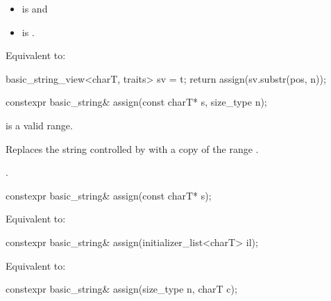 \begin{itemdescr}
\pnum
\constraints
\begin{itemize}
\item
{} is
 and
\item
{} is
.
\end{itemize}

\pnum
\effects
Equivalent to:
\begin{codeblock}
basic_string_view<charT, traits> sv = t;
return assign(sv.substr(pos, n));
\end{codeblock}
\end{itemdescr}

%
\begin{itemdecl}
constexpr basic_string& assign(const charT* s, size_type n);
\end{itemdecl}

\begin{itemdescr}
\pnum
\expects
{} is a valid range.

\pnum
\effects
Replaces the string controlled by  with
a copy of the range .

\pnum
\returns
{}.
\end{itemdescr}

%
\begin{itemdecl}
constexpr basic_string& assign(const charT* s);
\end{itemdecl}

\begin{itemdescr}
\pnum
\effects
Equivalent to: 
\end{itemdescr}

%
\begin{itemdecl}
constexpr basic_string& assign(initializer_list<charT> il);
\end{itemdecl}

\begin{itemdescr}
\pnum
\effects
Equivalent to: 
\end{itemdescr}

%
\begin{itemdecl}
constexpr basic_string& assign(size_type n, charT c);
\end{itemdecl}

